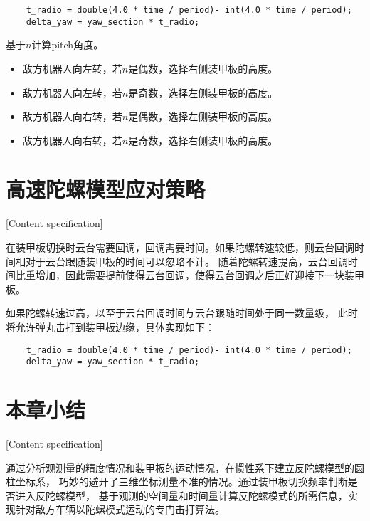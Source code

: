 \begin{lstlisting}
    t_radio = double(4.0 * time / period)- int(4.0 * time / period);
    delta_yaw = yaw_section * t_radio;
\end{lstlisting}

基于$n$计算pitch角度。

\begin{itemize}[itemindent=2em]
    \item 敌方机器人向左转，若$n$是偶数，选择右侧装甲板的高度。
    \item 敌方机器人向左转，若$n$是奇数，选择左侧装甲板的高度。
    \item 敌方机器人向右转，若$n$是偶数，选择左侧装甲板的高度。
    \item 敌方机器人向右转，若$n$是奇数，选择右侧装甲板的高度。
\end{itemize}






\section{高速陀螺模型应对策略}[Content specification]


在装甲板切换时云台需要回调，回调需要时间。如果陀螺转速较低，则云台回调时间相对于云台跟随装甲板的时间可以忽略不计。
随着陀螺转速提高，云台回调时间比重增加，因此需要提前使得云台回调，使得云台回调之后正好迎接下一块装甲板。

\par

如果陀螺转速过高，以至于云台回调时间与云台跟随时间处于同一数量级，
此时将允许弹丸击打到装甲板边缘，具体实现如下：

\begin{lstlisting}
    t_radio = double(4.0 * time / period)- int(4.0 * time / period);
    delta_yaw = yaw_section * t_radio;
\end{lstlisting}

\section{本章小结}[Content specification]

通过分析观测量的精度情况和装甲板的运动情况，在惯性系下建立反陀螺模型的圆柱坐标系，
巧妙的避开了三维坐标测量不准的情况。通过装甲板切换频率判断是否进入反陀螺模型，
基于观测的空间量和时间量计算反陀螺模式的所需信息，实现针对敌方车辆以陀螺模式运动的专门击打算法。
